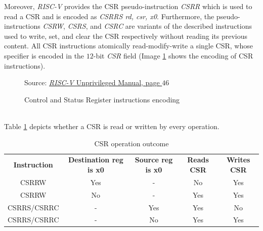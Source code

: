 Moreover, \textit{RISC-V} provides the CSR pseudo-instruction \textit{CSRR}
which is used to read a CSR and is encoded as \textit{CSRRS rd, csr, x0}.
Furthermore, the pseudo-instructions \textit{CSRW}, \textit{CSRS}, and \textit{CSRC}
are variants of the described instructions used to write, set, and clear the CSR
respectively without reading its previous content. All CSR instructions atomically
read-modify-write a single CSR, whose specifier is encoded in the $12$-bit
\textit{CSR} field (Image \ref{fig:csrinstr} shows the encoding of CSR
instructions). \\
\begin{figure}[htbp]
  \centering
  \def\stackalignment{r} %
  {\scriptsize Source: \href{https://drive.google.com/file/d/1uviu1nH-tScFfgrovvFCrj7Omv8tFtkp/view}{\textit{RISC-V} Unprivileged Manual, page $46$}}
  \caption{Control and Status Register instructions encoding}
  \label{fig:csrinstr}
\end{figure}
\\

Table \ref{tab:csrop} depicts whether a CSR is read or written by every operation.

\begin{table}
  \centering
  \begin{tabular}{|c|c|c|c|c|}
    \hline
    \textbf{Instruction} & \textbf{Destination reg is x0} & \textbf{Source reg is x0} & \textbf{Reads CSR} & \textbf{Writes CSR} \\
    \hhline{=====} CSRRW & Yes                            & -                         & No                 & Yes                 \\
    \hline
    CSRRW                & No                             & -                         & Yes                & Yes                 \\
    \hline
    CSRRS/CSRRC          & -                              & Yes                       & Yes                & No                  \\
    \hline
    CSRRS/CSRRC          & -                              & No                        & Yes                & Yes                 \\
    \hline
  \end{tabular}
  \caption{CSR operation outcome}
  \label{tab:csrop}
\end{table}

